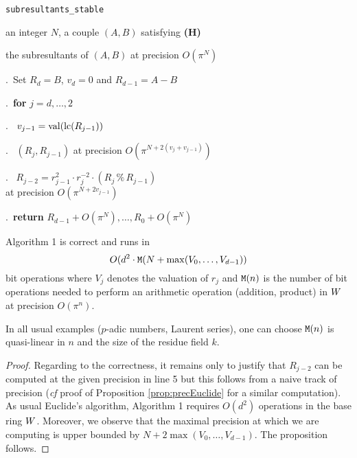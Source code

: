 \documentclass{sig-alternate}
\DeclareMathOperator{\val}{val}
\begin{document}
\noindent\hrulefill

 {\tt subresultants\_stable}

 an integer $N$, a couple $(A,B)$ satisfying {\bf (H)}

 the subresultants of $(A,B)$ at precision $O(\pi^N)$

\smallskip{}.\ Set $R_d = B$, $v_d = 0$ and $R_{d-1} = A-B$

\smallskip{}.\ {\bf for} $j=d,\dots,2$

\smallskip{}.\ \hspace{0.3cm}{\bf compute} $v_{j-1} = \val(\lc(R_{j-1}))$

\smallskip{}.\ \hspace{0.3cm}{\bf lift} $(R_j, R_{j-1})$ at precision $O(\pi^{N+2(v_j + v_{j-1})})$

\smallskip{}.\ \hspace{0.3cm}{\bf compute} $R_{j-2} = r_{j-1}^2 \cdot r_j^{-2} \cdot (R_j \,\%\, R_{j-1})$\\
\phantom{6.\ }\hspace{0.3cm}at precision $O(\pi^{N+2 v_{j-1}})$

\smallskip{}.\ {\bf return} $R_{d-1} + O(\pi^N), \ldots,
R_0 + O(\pi^N)$

\vspace{-1ex}\noindent\hrulefill

\begin{prop}
Algorithm 1 is correct and runs in
$$O(d^2 \cdot \text{\tt M}(N + \max(V_0, \ldots, V_{d-1}))$$
bit operations where $V_j$ denotes the valuation of $r_j$ and 
$\text{\tt M}(n)$ is the number of bit operations needed to perform an 
arithmetic operation (addition, product) in $W$ at precision 
$O(\pi^n)$.
\end{prop}

\begin{rem}
\label{rem:M}
In all usual examples ($p$-adic numbers, Laurent series), one can 
choose $\text{\tt M}(n)$ is quasi-linear in $n$ and the size of the residue
field $k$.
\end{rem}

\begin{proof}
Regarding to the correctness, it remains only to justify that $R_{j-2}$ 
can be computed at the given precision in line 5 but this follows 
from a naive track of precision (\emph{cf} proof of Proposition
\ref{prop:precEuclide} for a similar computation).
As usual Euclide's algorithm, Algorithm 1 requires $O(d^2)$ operations 
in the base ring $W$. Moreover, we observe that the maximal precision 
at which we are computing is upper bounded by $N + 2 \max(V_0, \ldots, 
V_{d-1})$. The proposition follows.
\end{proof}
\end{document}
